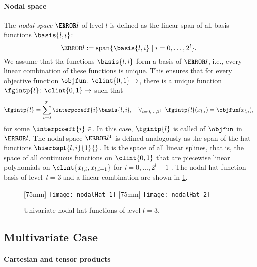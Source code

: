 \paragraph{Nodal space}

The \emph{nodal space} $\ns{l}$ of level $l$
is defined as the linear span of all basis functions
$\basis{l,i}$:
\begin{equation}
  \ns{l} := \spn\{\basis{l,i} \mid i = 0, \dotsc, 2^l\}.
\end{equation}
We assume that the functions $\basis{l,i}$ form a basis of $\ns{l}$, i.e.,
every linear combination of these functions is unique.
This ensures that for every objective function $\objfun\colon \clint{0, 1} \to \real$,
there is a unique function $\fgintp{l}\colon \clint{0, 1} \to \real$ such that
\begin{equation}
  \label{eq:interpFullGridUV}
  \fgintp{l}
  = \sum_{i=0}^{2^l} \interpcoeff{i} \basis{l,i},\quad
  \fa{i = 0, \dotsc, 2^l}{\fgintp{l}(\gp{l,i}) = \objfun(\gp{l,i})},
\end{equation}
for some $\interpcoeff{i} \in \real$.
In this case, $\fgintp{l}$ is called  of $\objfun$ in $\ns{l}$.
The nodal space $\ns{l}^1$ is defined analogously as the span of the
hat functions $\hierbspl{l,i}{1}{}$.
It is the space of all linear splines,
that is, the space of all continuous functions on $\clint{0, 1}$ that are
piecewise linear polynomials on $\clint{\gp{l,i}, \gp{l,i+1}}$ for
$i = 0, \dotsc, 2^l - 1$ \cite{Hoellig13Approximation}.
The nodal hat function basis of level~$l = 3$
and a linear combination are shown in \cref{fig:nodalHat}.

\begin{figure}
  [75mm]{%
    \texttt{[image: nodalHat\_1]}%
  }%
  \hfill%
  [75mm]{%
    \texttt{[image: nodalHat\_2]}%
  }%
  \caption{Univariate nodal hat functions of level $l = 3$.}
  \label{fig:nodalHat}
\end{figure}



\subsection{Multivariate Case}
\label{sec:212nodalMV}

\paragraph{Cartesian and tensor products}

